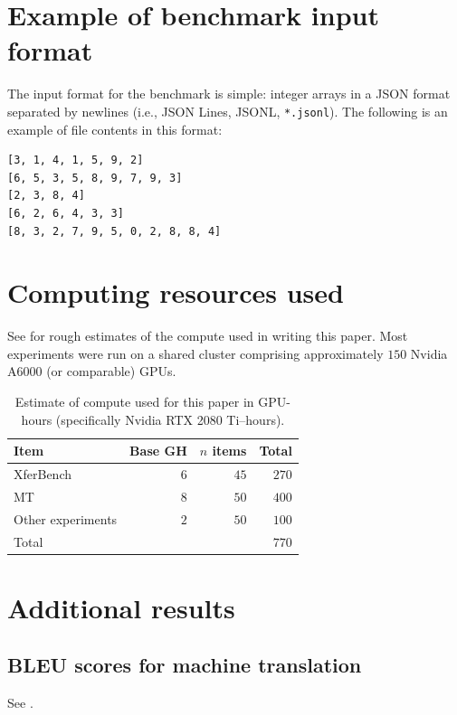 \section{Example of benchmark input format}
\unskip\label{sec:input-example}

The input format for the benchmark is simple: integer arrays in a JSON format separated by newlines (i.e., JSON Lines, JSONL, {\small\texttt{{}*.jsonl}}).
The following is an example of file contents in this format:
\begin{verbatim}
[3, 1, 4, 1, 5, 9, 2]
[6, 5, 3, 5, 8, 9, 7, 9, 3]
[2, 3, 8, 4]
[6, 2, 6, 4, 3, 3]
[8, 3, 2, 7, 9, 5, 0, 2, 8, 8, 4]
\end{verbatim}



\section{Computing resources used}
See  for rough estimates of the compute used in writing this paper.
Most experiments were run on a shared cluster comprising approximately $150$ Nvidia A6000 (or comparable) GPUs.
\begin{table}
  \centering
  \begin{tabular}{lrrr}
    \toprule
    Item & Base GH & $n$ items & Total \\
    \midrule
    XferBench         & $6$ & $45$ & $270$ \\
    MT                & $8$ & $50$ & $400$ \\
    Other experiments & $2$ & $50$ & $100$ \\
    \midrule
    Total             & & & $770$ \\
    \bottomrule
  \end{tabular}
  \caption{Estimate of compute used for this paper in GPU-hours (specifically Nvidia RTX 2080 Ti--hours).}
  \unskip\label{tab:compute}
\end{table}


\section{Additional results}

\subsection{BLEU scores for machine translation}
\unskip\label{sec:mt-bleu}
See .
\begin{table}
  \centering
  \caption{BLEU scores for machine translation experiment.  Colors normalized by column.}
  \unskip\label{tab:mt-bleu}
\end{table}

